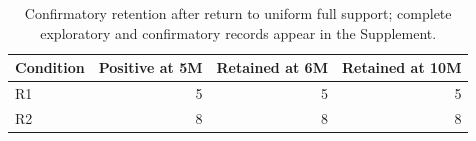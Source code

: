 \begin{table}[!htbp]
\centering
\caption{Confirmatory retention after return to uniform full support; complete exploratory and confirmatory records appear in the Supplement.}
\label{tab:table06-cue-removal-persistence-main}
\small
\setlength{\tabcolsep}{4pt}
\begin{tabular}{lrrr}
\toprule
Condition & Positive at 5M & Retained at 6M & Retained at 10M \\
\midrule
R1 & 5 & 5 & 5 \\
R2 & 8 & 8 & 8 \\
\bottomrule
\end{tabular}
\end{table}
